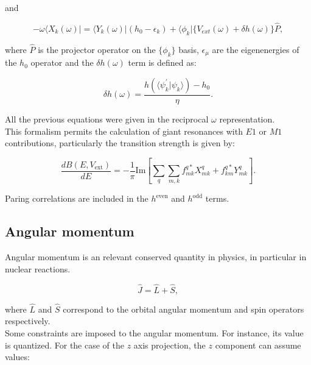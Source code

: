 \documentclass[openany]{book}
\begin{document}
and 

\begin{equation}\label{eq:micro_FAM_Y}
	 - \omega \langle X_k(\omega) | =  \langle Y_k(\omega) | (h_0 - \epsilon_k) + \langle \phi_k | \{V_{ext}(\omega) + \delta h (\omega)\}  \hat{P},
\end{equation}

 where $\hat{P}$ is the projector operator on the $\{\phi_k\}$ basis, $\epsilon_\mu$ are the eigenenergies of the $h_0$ operator and the $\delta h(\omega)$ term is defined as:
 
 \begin{equation}\label{eq:micro_FAM_deltah}
 	\delta h(\omega) = \frac{h(\langle \psi^{'}_k| \psi_k \rangle ) - h_0}{\eta}.
 \end{equation}
 
 All the previous equations were given in the reciprocal $\omega$ representation.  \\

This formalism permits the calculation of giant resonances with $E1$ or $M1$ contributions, particularly the transition strength is given by: 

\begin{equation}\label{eq:micro_FAM_transitionStrength}
	\frac{dB(E, V_{\mathrm{ext}})}{dE} =  - \frac{1}{\pi} \mathrm{Im} \left[\sum_{q} \sum_{m, k} {f^{q*}_{mk}X^{q}_{mk} + f^{q*}_{km}Y^{q}_{mk} } \right].
	\end{equation}

Paring correlations are included in the $h^{\mathrm{even}}$ and $h^{\mathrm{odd}}$ terms.

\subsection{Angular momentum}  \label{sub:quantumAngularMomentum}

Angular momentum is an relevant conserved quantity in physics, in particular in nuclear reactions.

\begin{equation} \label{eq:angularMomentum_definition}
	\hat J = \hat L + \hat S,
\end{equation}

where $\hat L$ and $\hat S$ correspond to the orbital angular momentum and spin operators respectively. \\

Some constraints are imposed to the angular momentum. For instance, its value is quantized. For the case of the $z$ axis projection, the $z$ component can assume values:
\end{document}
